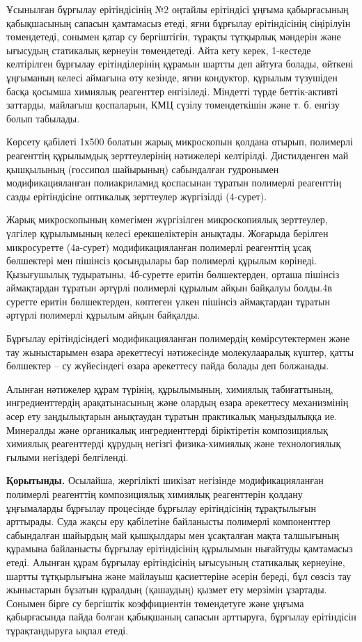 \begin{multicols}{2}
Ұсынылған бұрғылау ерітіндісінің №2 оңтайлы ерітіндісі ұңғыма
қабырғасының қабықшасының сапасын қамтамасыз етеді, яғни бұрғылау
ерітіндісінің сіңірілуін төмендетеді, сонымен қатар су бергіштігін,
тұрақты тұтқырлық мәндерін және ығысудың статикалық кернеуін
төмендетеді. Айта кету керек, 1-кестеде келтірілген бұрғылау
ерітінділерінің құрамын шартты деп айтуға болады, өйткені ұңғыманың
келесі аймағына өту кезінде, яғни кондуктор, құрылым түзушіден басқа
қосымша химиялық реагенттер енгізіледі. Міндетті түрде беттік-активті
заттарды, майлағыш қоспаларын, КМЦ сүзілу төмендеткішін және т. б.
енгізу болып табылады.

Көрсету қабілеті 1х500 болатын жарық микроскопын қолдана отырып,
полимерлі реагенттің құрылымдық зерттеулерінің нәтижелері келтірілді.
Дистилденген май қышқылының (госсипол шайырының) сабындалған гудронымен
модификацияланған полиакриламид қоспасынан тұратын полимерлі реагенттің
сазды ерітіндісіне оптикалық зерттеулер жүргізілді (4-сурет).

Жарық микроскопының көмегімен жүргізілген микроскопиялық зерттеулер,
үлгілер құрылымының келесі ерекшеліктерін анықтады. Жоғарыда берілген
микросуретте (4а-сурет) модификацияланған полимерлі реагенттің ұсақ
бөлшектері мен пішінсіз қосындылары бар полимерлі құрылым көрінеді.
Қызығушылық тудыратыны, 4б-суретте еритін бөлшектерден, орташа пішінсіз
аймақтардан тұратын әртүрлі полимерлі құрылым айқын байқалуы болды.4в
суретте еритін бөлшектерден, көптеген үлкен пішінсіз аймақтардан тұратын
әртүрлі полимерлі құрылым айқын байқалды.

Бұрғылау ерітіндісіндегі модификацияланған полимердің көмірсутектермен
және тау жыныстарымен өзара әрекеттесуі нәтижесінде молекулааралық
күштер, қатты бөлшектер -- су жүйесіндегі өзара әрекеттесу пайда болады
деп болжанады.

Алынған нәтижелер құрам түрінің, құрылымының, химиялық табиғаттының,
ингредиенттердің арақатынасының және олардың өзара әрекеттесу
механизмінің әсер ету заңдылықтарын анықтаудан тұратын практикалық
маңыздылыққа ие. Минералды және органикалық ингредиенттерді біріктіретін
композициялық химиялық реагенттерді құрудың негізгі физика-химиялық және
технологиялық ғылыми негіздері белгіленді.

{\bfseries Қорытынды.} Осылайша, жергілікті шикізат негізінде
модификацияланған полимерлі реагенттің композициялық химиялық
реагенттерін қолдану ұңғымаларды бұрғылау процесінде бұрғылау
ерітіндісінің тұрақтылығын арттырады. Суда жақсы еру қабілетіне
байланысты полимерлі компоненттер сабындалған шайырдың май қышқылдары
мен ұсақталған мақта талшығының құрамына байланысты бұрғылау
ерітіндісінің құрылымын нығайтуды қамтамасыз етеді. Алынған құрам
бұрғылау ерітіндісінің ығысуының статикалық кернеуіне, шартты
тұтқырлығына және майлауыш қасиеттеріне әсерін береді, бұл сөзсіз тау
жыныстарын бұзатын құралдың (қашаудың) қызмет ету мерзімін ұзартады.
Сонымен бірге су бергіштік коэффициентін төмендетуге және ұңғыма
қабырғасында пайда болған қабықшаның сапасын арттыруға, бұрғылау
ерітіндісін тұрақтандыруға ықпал етеді.


\end{multicols}
